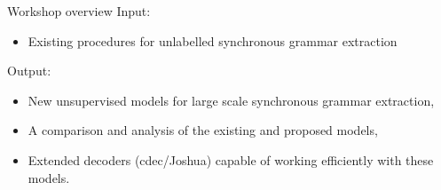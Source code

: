 \documentclass{beamer}
\begin{document}
\begin{frame}[t]{Workshop overview}
Input:
  \begin{itemize}
  \item Existing procedures for unlabelled synchronous grammar extraction
  \end{itemize}
\vspace{0.3in}
Output:
  \begin{itemize}
    \item New unsupervised models for large scale synchronous grammar extraction,
    \item A comparison and analysis of the existing and proposed models,
    \item Extended decoders (cdec/Joshua) capable of working efficiently with these models.
  \end{itemize}
\end{frame}




\end{document}

